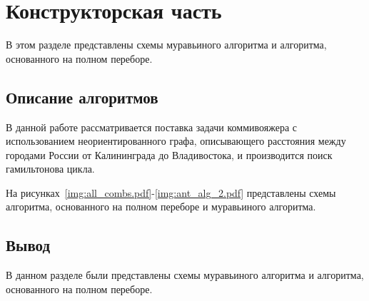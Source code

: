 \chapter{Конструкторская часть}

В этом разделе представлены схемы муравьиного алгоритма и алгоритма, основанного на полном переборе.

\section{Описание алгоритмов}
В данной работе рассматривается поставка задачи коммивояжера с использованием неориентированного графа, описывающего расстояния между городами России от Калининграда до Владивостока, и производится поиск гамильтонова цикла.

На рисунках~\ref{img:all_combs.pdf}-\ref{img:ant_alg_2.pdf} представлены схемы алгоритма, основанного на полном переборе и муравьиного алгоритма.

\FloatBarrier
{}
\FloatBarrier
{}
\FloatBarrier
{}
\FloatBarrier

\section*{Вывод}

В данном разделе были представлены схемы муравьиного алгоритма и алгоритма, основанного на полном переборе.
\clearpage
